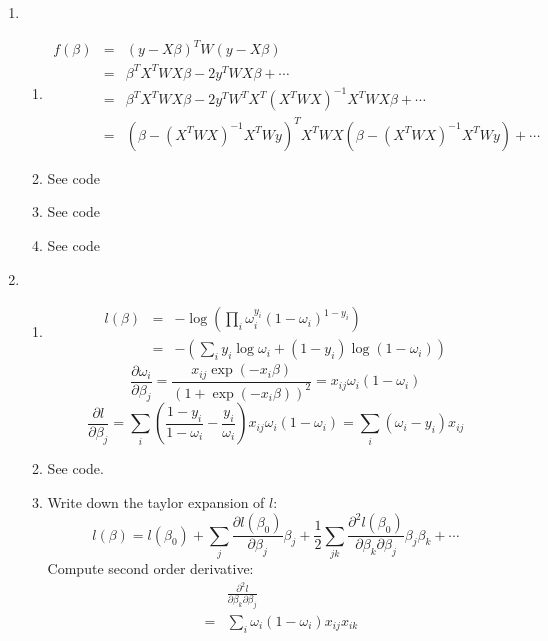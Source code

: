 \documentclass{article}
\begin{document}
\begin{enumerate}
\item
\begin{enumerate}[A]
\item
\begin{eqnarray}
f(\beta)&=&(y-X\beta)^TW(y-X\beta)\nonumber\\
&=&\beta^TX^TWX\beta-2y^TWX\beta+\cdots\nonumber\\
&=&\beta^T X^TWX\beta-2y^TW^TX^T(X^TWX)^{-1}X^TWX\beta+\cdots\nonumber\\
&=&(\beta-(X^TWX)^{-1}X^TWy)^TX^TWX(\beta-(X^TWX)^{-1}X^TWy)+\cdots
\end{eqnarray}
\item
See code
\item
See code
\item
See code
\end{enumerate}
\item
\begin{enumerate}[A]
\item
\begin{eqnarray}
l(\beta)&=&-\log(\prod_i\omega_i^{y_i}(1-\omega_i)^{1-y_i})\nonumber\\
&=&-(\sum_iy_i\log\omega_i+(1-y_i)\log(1-\omega_i))
\end{eqnarray}
\[
\frac{\partial\omega_i}{\partial\beta_j}=\frac{x_{ij}\exp(-x_i\beta)}{(1+\exp(-x_i\beta))^2}=x_{ij}\omega_i(1-\omega_i)
\]
\[
\frac{\partial l}{\partial\beta_j}=\sum_i(\frac{1-y_i}{1-\omega_i}-\frac{y_i}{\omega_i})x_{ij}\omega_i(1-\omega_i)=\sum_i(\omega_i-y_i)x_{ij}
\]
\item
See code.
\item
Write down the taylor expansion of $l$:
\[
l(\beta)=l(\beta_0)+\sum_j\frac{\partial l(\beta_0)}{\partial\beta_j}\beta_j+\frac{1}{2}\sum_{jk}\frac{\partial^2l(\beta_0)}{\partial\beta_k\partial\beta_j}\beta_j\beta_k+\cdots
\]
Compute second order derivative:
\begin{eqnarray}
&&\frac{\partial^2 l}{\partial\beta_k\partial\beta_j}\nonumber\\
&=&\sum_i\omega_i(1-\omega_i)x_{ij}x_{ik}
\end{eqnarray}


\end{enumerate}
\end{enumerate}
\end{document}
